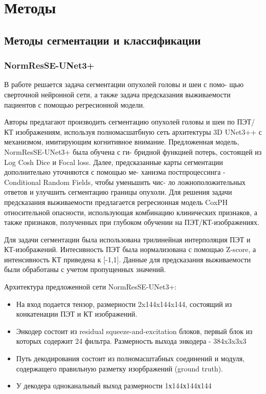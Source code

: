 
\section{Методы}
\subsection{Методы сегментации и классификации}

\subsubsection*{NormResSE-UNet3+}
В работе \cite{NormRes} решается задача сегментации опухолей головы и шеи с помо-
щью сверточной нейронной сети, а также задача предсказания выживаемости
пациентов с помощью регресионной модели. \par 
Авторы предлагают производить сегментацию опухолей головы и шеи
по ПЭТ/КТ изображениям, используя полномасшатбную сеть архитектуры
3D UNet3++ \cite{Unet} с механизмом, имитирующим когнитивное внимание. Предложенная модель, NormResSE-UNet3+ была обучена с ги-
бридной функцией потерь, состоящей из Log Cosh Dice и Focal loss. Далее,
предсказанные карты сегментации дополнительно уточняются с помощью ме-
ханизма постпроцессинга - Conditional Random Fields, чтобы уменьшить чис-
ло ложноположительных ответов и улучшить сегментацию границы опухоли.
Для решения задачи предсказания выживаемости предлагается регресионная
модель CoxPH относительной опасности, использующая комбинацию клинических признаков, а также признаков, полученных
при глубоком обучении на ПЭТ/КТ-изображениях.

Для задачи сегментации была использована трилинейная интерполяция
ПЭТ и КТ-изображений. Интесивность ПЭТ была нормализована с помощью Z-score, а 
интенсивность КТ приведена к [-1,1].
Данные для предсказания выживаемости были обработаны с учетом
пропущенных значений. \par

Архитектура предложенной сети NormResSE-UNet3+: 
\begin{itemize}
    \item На вход подается тензор, размерности 2x144x144x144, состоящий из конкатенации
    ПЭТ и КТ изображений.
    \item Энкодер состоит из residual squeeze-and-excitation блоков, первый блок из которых 
    содержит 24 фильтра. Размерность выхода энкодера - 384x3x3x3
    \item Путь декодирования состоит из полномасштабных соединений и модуля, содержащего 
    правильную разметку изорбражений (ground truth).
    \item У декодера одноканальный выход размерности 1х144х144х144
\end{itemize}

